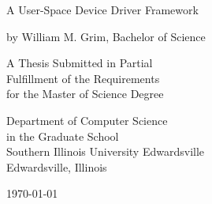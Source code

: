 \begin{center}
\doublespacing
A User-Space Device Driver Framework

by William M. Grim, Bachelor of Science

\singlespacing
\vspace{4cm}

A Thesis Submitted in Partial\\
Fulfillment of the Requirements\\
for the Master of Science Degree

\vspace{4cm}

Department of Computer Science\\
in the Graduate School\\
Southern Illinois University Edwardsville\\
Edwardsville, Illinois

\vspace{3cm}

\today
\end{center}
